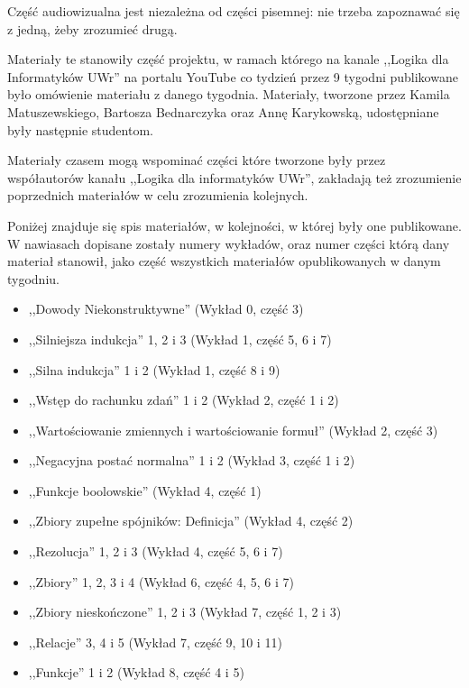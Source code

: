 Część audiowizualna jest niezależna od części pisemnej: nie trzeba zapoznawać się z jedną, żeby zrozumieć drugą.

Materiały te stanowiły część projektu, w ramach którego na kanale ,,Logika dla Informatyków UWr'' na portalu YouTube co tydzień przez 9 tygodni publikowane było omówienie materiału z danego tygodnia. Materiały, tworzone przez Kamila Matuszewskiego, Bartosza Bednarczyka oraz Annę Karykowską, udostępniane były następnie studentom. 

Materiały czasem mogą wspominać części które tworzone były przez współautorów kanału ,,Logika dla informatyków UWr'', zakładają też zrozumienie poprzednich materiałów w celu zrozumienia kolejnych.

Poniżej znajduje się spis materiałów, w kolejności, w której były one publikowane. W nawiasach dopisane zostały numery wykładów, oraz numer części którą dany materiał stanowił, jako część wszystkich materiałów opublikowanych w danym tygodniu.

\begin{itemize}
    \item ,,Dowody Niekonstruktywne'' (Wykład 0, część 3)
    \item ,,Silniejsza indukcja'' 1, 2 i 3 (Wykład 1, część 5, 6 i 7)
    \item ,,Silna indukcja'' 1 i 2 (Wykład 1, część 8 i 9)
    \item ,,Wstęp do rachunku zdań'' 1 i 2 (Wykład 2, część 1 i 2)
    \item ,,Wartościowanie zmiennych i wartościowanie formuł'' (Wykład 2, część 3)
    \item ,,Negacyjna postać normalna'' 1 i 2 (Wykład 3, część 1 i 2)
    \item ,,Funkcje boolowskie'' (Wykład 4, część 1)
    \item ,,Zbiory zupełne spójników: Definicja'' (Wykład 4, część 2)
    \item ,,Rezolucja'' 1, 2 i 3 (Wykład 4, część 5, 6 i 7)
    \item ,,Zbiory'' 1, 2, 3 i 4 (Wykład 6, część 4, 5, 6 i 7)
    \item ,,Zbiory nieskończone'' 1, 2 i 3 (Wykład 7, część 1, 2 i 3)
    \item ,,Relacje'' 3, 4 i 5 (Wykład 7, część 9, 10 i 11)
    \item ,,Funkcje'' 1 i 2 (Wykład 8, część 4 i 5)
\end{itemize}